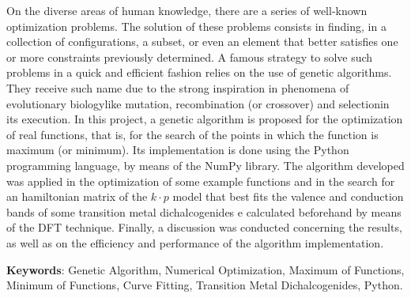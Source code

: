 On the diverse areas of human knowledge, there are a series of well-known optimization
problems. The solution of these problems consists in finding, in a collection of configurations,
a subset, or even an element that better satisfies one or more constraints previously determined. A
famous strategy to solve such problems in a quick and efficient fashion relies on the use of
genetic algorithms. They receive such name due to the strong inspiration in phenomena of
evolutionary biology\trav like mutation, recombination (or crossover) and selection\trav in its execution. 
In this project, a genetic algorithm is proposed for the
optimization of real functions, that is, for the search of the points in which the function is
maximum (or minimum). Its implementation is done using the Python programming language, by means of the NumPy library.
The algorithm developed was applied in the optimization of some example
functions and in the search for an hamiltonian matrix of the $ k \cdot p $ model
that best fits the valence and conduction bands of some transition metal
dichalcogenides\trav {} e \trav calculated beforehand by means
of the DFT technique. Finally, a discussion was conducted concerning the
results, as well as on the efficiency and performance of the algorithm implementation.

\vspace{\onelineskip}\noindent
\textbf{Keywords}: Genetic Algorithm, Numerical Optimization, Maximum of
Functions, Minimum of Functions, Curve Fitting, Transition Metal Dichalcogenides,
Python.
